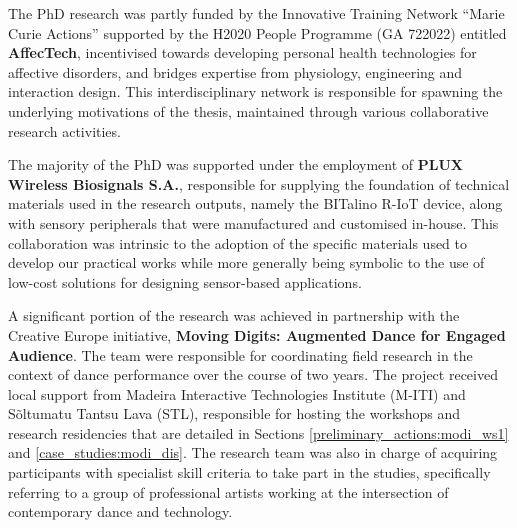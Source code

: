 
        The PhD research was partly funded by the Innovative Training Network “Marie Curie Actions” supported by the H2020 People Programme (GA 722022) entitled \textbf{AffecTech}, incentivised towards developing personal health technologies for affective disorders, and bridges expertise from physiology, engineering and interaction design. This interdisciplinary network is responsible for spawning the underlying motivations of the thesis, maintained through various collaborative research activities.


        The majority of the PhD was supported under the employment of \textbf{PLUX Wireless Biosignals S.A.}, responsible for supplying the foundation of technical materials used in the research outputs, namely the BITalino R-IoT device, along with sensory peripherals that were manufactured and customised in-house. This collaboration was intrinsic to the adoption of the specific materials used to develop our practical works while more generally being symbolic to the use of low-cost solutions for designing sensor-based applications.


        A significant portion of the research was achieved in partnership with the Creative Europe initiative, \textbf{Moving Digits: Augmented Dance for Engaged Audience}. The team were responsible for coordinating field research in the context of dance performance over the course of two years. The project received local support from Madeira Interactive Technologies Institute (M-ITI) and Sõltumatu Tantsu Lava (STL), responsible for hosting the workshops and research residencies that are detailed in Sections \ref{preliminary_actions:modi_ws1} and \ref{case_studies:modi_dis}. The research team was also in charge of acquiring participants with specialist skill criteria to take part in the studies, specifically referring to a group of professional artists working at the intersection of contemporary dance and technology.


